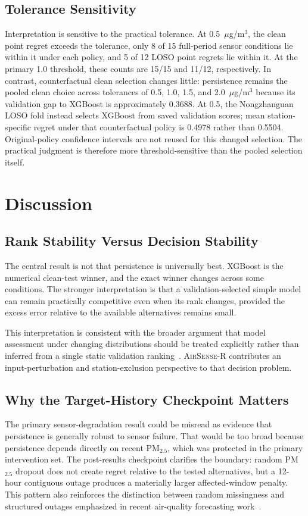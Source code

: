 \documentclass[journal]{IEEEtran}
\newcommand{\AirSense}{\textsc{AirSense-R}}
\begin{document}
\subsection{Tolerance Sensitivity}
Interpretation is sensitive to the practical tolerance. At 0.5~$\mu$g/m$^3$, the clean point regret exceeds the tolerance, only 8 of 15 full-period sensor conditions lie within it under each policy, and 5 of 12 LOSO point regrets lie within it. At the primary 1.0 threshold, these counts are 15/15 and 11/12, respectively. In contrast, counterfactual clean selection changes little: persistence remains the pooled clean choice across tolerances of 0.5, 1.0, 1.5, and 2.0~$\mu$g/m$^3$ because its validation gap to XGBoost is approximately 0.3688. At 0.5, the Nongzhanguan LOSO fold instead selects XGBoost from saved validation scores; mean station-specific regret under that counterfactual policy is 0.4978 rather than 0.5504. Original-policy confidence intervals are not reused for this changed selection. The practical judgment is therefore more threshold-sensitive than the pooled selection itself.

\section{Discussion}

\subsection{Rank Stability Versus Decision Stability}
The central result is not that persistence is universally best. XGBoost is the numerical clean-test winner, and the exact winner changes across some conditions. The stronger interpretation is that a validation-selected simple model can remain practically competitive even when its rank changes, provided the excess error relative to the available alternatives remains small.

This interpretation is consistent with the broader argument that model assessment under changing distributions should be treated explicitly rather than inferred from a single static validation ranking~\cite{han2024selection,semper2026dss}. \AirSense{} contributes an input-perturbation and station-exclusion perspective to that decision problem.

\subsection{Why the Target-History Checkpoint Matters}
The primary sensor-degradation result could be misread as evidence that persistence is generally robust to sensor failure. That would be too broad because persistence depends directly on recent PM$_{2.5}$, which was protected in the primary intervention set. The post-results checkpoint clarifies the boundary: random PM$_{2.5}$ dropout does not create regret relative to the tested alternatives, but a 12-hour contiguous outage produces a materially larger affected-window penalty. This pattern also reinforces the distinction between random missingness and structured outages emphasized in recent air-quality forecasting work~\cite{alvaradoalcon2026citywide}.
\end{document}
